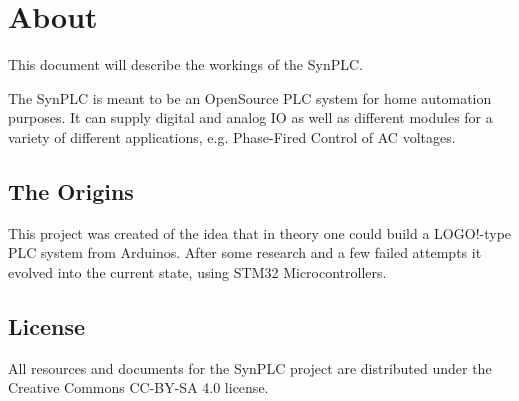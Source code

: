 \chapter{About}

This document will describe the workings of the SynPLC.

The SynPLC is meant to be an OpenSource PLC system for home automation purposes. It can supply digital and analog IO as well as different modules for a variety of different applications, e.g. Phase-Fired Control of AC voltages. 

\section{The Origins}

This project was created of the idea that in theory one could build a LOGO!-type PLC system from Arduinos. After some research and a few failed attempts it evolved into the current state, using STM32 Microcontrollers. 


\section{License}
All resources and documents for the SynPLC project are distributed under the Creative Commons CC-BY-SA 4.0 license.

